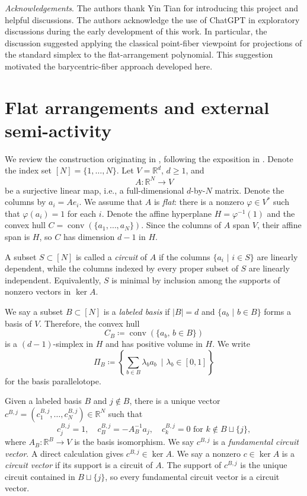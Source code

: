 \documentclass[12pt]{amsart}
\numberwithin{equation}{section}
\numberwithin{theorem}{section}
\newcommand{\op}{\operatorname}
\newcommand{\R}{\mathbb{R}}
\begin{document}
\vskip0.5cm
\noindent \textit{Acknowledgements}. 
The authors thank Yin Tian for introducing this project and helpful discussions.
The authors acknowledge the use of ChatGPT in exploratory discussions during the early development of this work. 
In particular, the discussion suggested applying the classical point-fiber viewpoint for projections of the standard simplex to the flat-arrangement polynomial. This suggestion motivated the barycentric-fiber approach developed here. 

\section{Flat arrangements and external semi-activity}
\label{sec-flat-arrangements}

We review the construction originating in \cite{LP13}, following the exposition in \cite[Section~3]{KMP}. Denote the index set $[N]=\{1,\dots,N\}$. Let $V=\R^d$, $d\geq1$, and
\begin{equation}
   A:\R^N\to V
\end{equation}
be a surjective linear map, i.e., a full-dimensional $d$-by-$N$ matrix. Denote the columns by $a_i=Ae_i$.
We assume that $A$ is \emph{flat}: there is a nonzero $\varphi\in V^*$ such that $\varphi(a_i)=1$ for each $i$. Denote the affine hyperplane $H=\varphi^{-1}(1)$ and the convex hull $C=\op{conv}(\{a_1,\dots,a_N\})$.
Since the columns of $A$ span $V$, their affine span is $H$, so $C$ has dimension $d-1$ in $H$.

A subset $S\subset[N]$ is called a \emph{circuit} of $A$ if the columns
$\{a_i\,\,|\,\,i\in S\}$ are linearly dependent, while the columns indexed by every proper subset of $S$ are linearly independent.
Equivalently, $S$ is minimal by inclusion among the supports of nonzero vectors in $\op{ker}A$.

We say a subset $B\subset[N]$ is a \emph{labeled basis} if $|B|=d$ and $\{a_b\,\,|\,\, b\in B\}$ forms a basis of $V$. Therefore, the convex hull
\begin{equation*}
  C_B\coloneqq \op{conv}(\{a_b,\,b\in B\})
\end{equation*}
is a $(d-1)$-simplex in $H$ and has positive volume in $H$. We write
\begin{equation*}
  \Pi_B\coloneqq \left\{\sum_{b\in B}\lambda_b a_b\,\,\,|\,\, \lambda_b\in[0,1]\right\}
\end{equation*}
for the basis parallelotope.

Given a labeled basis $B$ and $j\notin B$, there is a unique vector $c^{B,j}=(c^{B,j}_1,\dots,c^{B,j}_N)\in \R^N$ such that
\begin{equation*}
  c^{B,j}_j=1,\quad c^{B,j}_B=-A_B^{-1}a_j,\quad c^{B,j}_k=0\text{  for  } k\notin B\sqcup\{j\},
\end{equation*}
where $A_B:\R^B\to V$ is the basis isomorphism. We say $c^{B,j}$ is a \emph{fundamental circuit vector}. A direct calculation gives $c^{B,j}\in \op{ker}A$.
We say a nonzero $c\in\op{ker}A$ is a \emph{circuit vector} if its support is a circuit of $A$.
The support of $c^{B,j}$ is the unique circuit contained in $B\sqcup\{j\}$, so every fundamental circuit vector is a circuit vector.
\end{document}
